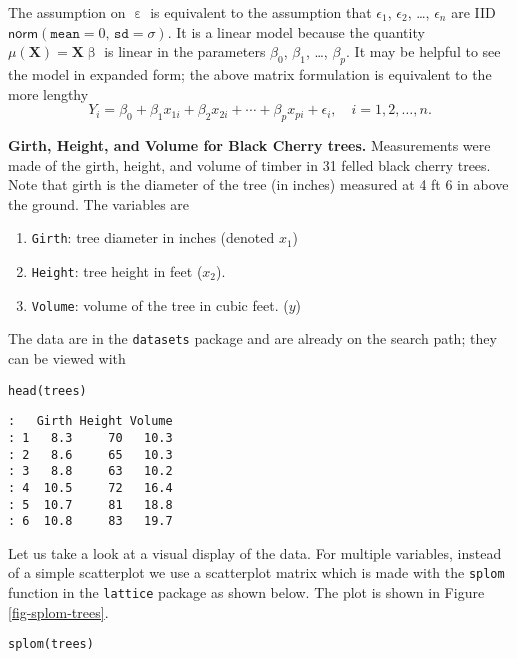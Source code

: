 The assumption on \(\upepsilon\) is equivalent to the assumption that
\(\epsilon_{1}\), \(\epsilon_{2}\), \ldots{}, \(\epsilon_{n}\) are IID
\(\mathsf{norm}(\mathtt{mean}=0,\,\mathtt{sd}=\sigma)\). It is a
linear model because the quantity
\(\mu(\mathbf{X})=\mathbf{X}\upbeta\) is linear in the parameters
\(\beta_{0}\), \(\beta_{1}\), \ldots{}, \(\beta_{p}\). It may be helpful to
see the model in expanded form; the above matrix formulation is
equivalent to the more lengthy
\begin{equation} 
Y_{i}=\beta_{0}+\beta_{1}x_{1i}+\beta_{2}x_{2i}+\cdots+\beta_{p}x_{pi}+\epsilon_{i},\quad i=1,2,\ldots,n.
\end{equation}


\textbf{Girth, Height, and Volume for Black Cherry trees.}  Measurements were made of the girth,
height, and volume of timber in 31 felled black cherry trees. Note
that girth is the diameter of the tree (in inches) measured at 4 ft 6
in above the ground. The variables are

\begin{enumerate}
\item \texttt{Girth}: tree diameter in inches (denoted \(x_{1}\))
\item \texttt{Height}: tree height in feet (\(x_{2}\)).
\item \texttt{Volume}: volume of the tree in cubic feet. (\(y\))
\end{enumerate}

The data are in the \texttt{datasets} package \cite{datasets} and are already
on the search path; they can be viewed with

\begin{verbatim}
head(trees)
\end{verbatim}

\begin{verbatim}
:   Girth Height Volume
: 1   8.3     70   10.3
: 2   8.6     65   10.3
: 3   8.8     63   10.2
: 4  10.5     72   16.4
: 5  10.7     81   18.8
: 6  10.8     83   19.7
\end{verbatim}

Let us take a look at a visual display of the data. For multiple
variables, instead of a simple scatterplot we use a scatterplot matrix
which is made with the \texttt{splom} function in the \texttt{lattice} package
\cite{lattice} as shown below. The plot is shown in Figure
\ref{fig-splom-trees}.

\begin{verbatim}
splom(trees)
\end{verbatim}


